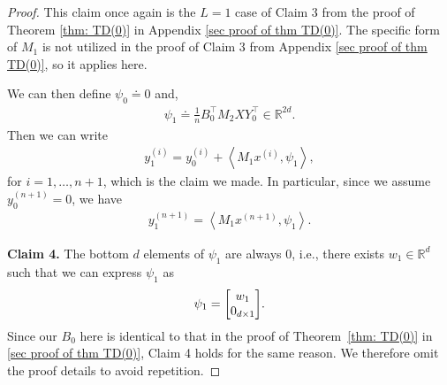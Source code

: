 \documentclass{article}
\newcommand{\R}{\mathbb{R}}
\newcommand{\indot}[2]{{\left<#1, #2\right>}}
\begin{document}
\begin{proof}
    This claim once again is the $L=1$ case of Claim 3 from the proof of Theorem \ref{thm: TD(0)} in Appendix \ref{sec proof of thm TD(0)}. The specific form of $M_1$ is not utilized in the proof of Claim 3 from Appendix \ref{sec proof of thm TD(0)}, so it applies here. 
    
    We can then define $\psi_0 \doteq 0$ and,
    \begin{align}
      \psi_{1} \doteq \frac{1}{n} B_0^\top M_2 X Y_0^\top \in \R^{2d}. \label{eq: L1 theta_l define }
    \end{align}
    Then we can write
    \begin{align}
        y_{1}^{(i)} = y_0^{(i)} + \indot{M_1 x^{(i)}}{\psi_{1}}, \label{eq: L1 y_l+1 evol theta}
    \end{align}
    for $i=1, \dots, n+1$, which is the claim we made.
    In particular, since we assume $y_0^{(n+1)} = 0$, we have
    \begin{align}
      y_{1}^{(n+1)} = \indot{M_1 x^{(n+1)}}{\psi_{1}}. 
    \end{align}
    
    
    \textbf{Claim 4.} The bottom $d$ elements of $\psi_1$ are always 0, i.e., there exists $w_1 \in \R^d$ such that we can express $\psi_1$ as
    \begin{align}
        \psi_1 = \mqty[w_1 \\ 0_{d \times 1}]. \label{eq: L1 theta_l sparsity}
    \end{align}
    Since our $B_0$ here is identical to that in the proof of Theorem~\ref{thm: TD(0)} in \ref{sec proof of thm TD(0)}, Claim 4 holds for the same reason. We therefore omit the proof details to avoid repetition.

    

\end{proof}
\end{document}
